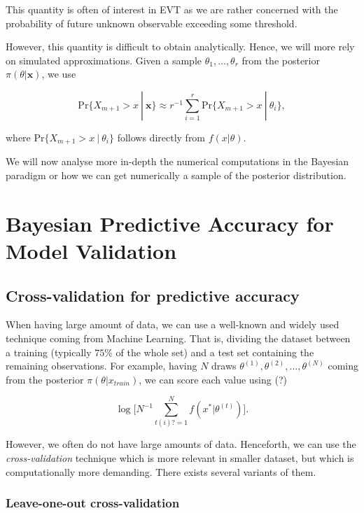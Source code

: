 This quantity is often of interest in EVT as we are rather concerned with the probability of future unknown observable exceeding some threshold.

However, this quantity is difficult to obtain analytically. Hence, we will more rely on simulated approximations. Given a sample $\theta_1,\dots,\theta_r$ from the posterior $\pi(\theta|\boldsymbol{x})$, we use 

\begin{equation}
\text{Pr}\{X_{m+1}>x\ | \ \boldsymbol{x}\}\approx r^{-1}\sum_{i=1}^r\text{Pr}\{X_{m+1}>x \ | \ \theta_i\},
\end{equation}

where $\text{Pr}\{X_{m+1}>x \ | \ \theta_i\}$ follows directly from $f(x|\theta)$. 

We will now analyse more in-depth the numerical computations in the Bayesian paradigm or how we can get numerically a sample of the posterior distribution.



\section{Bayesian Predictive Accuracy for Model Validation}

\subsection{Cross-validation for predictive accuracy}

When having large amount of data, we can use a well-known and widely used technique coming from Machine Learning. That is, dividing the dataset between a training (typically $75\%$ of the whole set) and a test set containing the remaining observations.
For example, having $N$ draws $\theta^{(1)},\theta^{(2)},\dots,\theta^{(N)}$ coming from the posterior $\pi(\theta|x_{train})$, we can score each value using (?)


\begin{equation}
\log\bigg[N^{-1}\sum_{t(i)?=1}^N f(x^*|\theta^{(t)})\bigg].
\end{equation}

However, we often do not have large amounts of data. Henceforth, we can use the \emph{cross-validation} technique which is more relevant in smaller dataset, but which is computationally more demanding. There exists several variants of them. 

\subsubsection*{Leave-one-out cross-validation}

